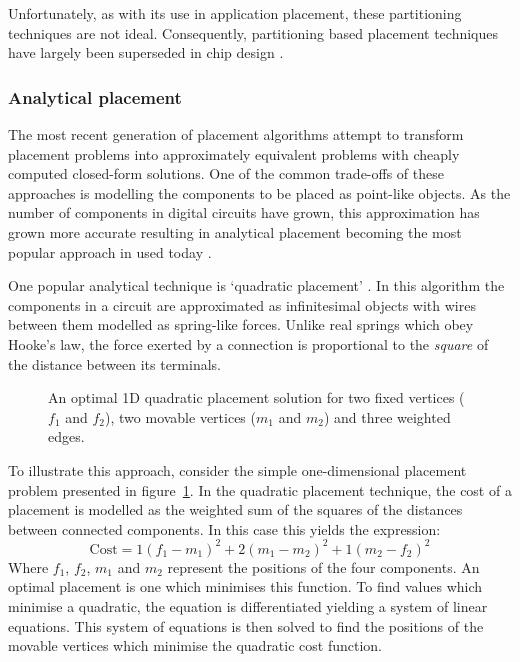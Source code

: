 				Unfortunately, as with its use in application placement, these
				partitioning techniques are not ideal.  Consequently, partitioning
				based placement techniques have largely been superseded in chip design
				\cite{markov15}.
			
			\subsubsection{Analytical placement}
				
				The most recent generation of placement algorithms attempt to transform
				placement problems into approximately equivalent problems with cheaply
				computed closed-form solutions. One of the common trade-offs of these
				approaches is modelling the components to be placed as point-like
				objects. As the number of components in digital circuits have grown,
				this approximation has grown more accurate resulting in analytical
				placement becoming the most popular approach in used today
				\cite{markov15}.
				
				One popular analytical technique is `quadratic placement'
				\cite{kahng11,spindler08}. In this algorithm the components in a
				circuit are approximated as infinitesimal objects with wires between
				them modelled as spring-like forces. Unlike real springs which obey
				Hooke's law, the force exerted by a connection is proportional to the
				\emph{square} of the distance between its terminals.
				
				\begin{figure}
					\center
					
					\caption{An optimal 1D quadratic placement solution for two fixed
					vertices ($f_1$ and $f_2$), two movable vertices ($m_1$ and $m_2$)
					and three weighted edges.}
					\label{fig:quadratic-placement}
				\end{figure}
				
				To illustrate this approach, consider the simple one-dimensional
				placement problem presented in figure~\ref{fig:quadratic-placement}.
				In the quadratic placement technique, the cost of a placement is
				modelled as the weighted sum of the squares of the distances between
				connected components. In this case this yields the expression:
				\begin{equation*}
					\textrm{Cost} = 1(f_1 - m_1)^2 + 2(m_1 - m_2)^2 + 1(m_2 - f_2)^2
				\end{equation*}
				Where $f_1$, $f_2$, $m_1$ and $m_2$ represent the positions of the four
				components. An optimal placement is one which minimises this function.
				To find values which minimise a quadratic, the equation is
				differentiated yielding a system of linear equations. This system of
				equations is then solved to find the positions of the movable vertices
				which minimise the quadratic cost function.
				
